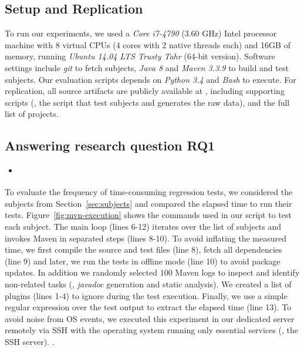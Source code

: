 \subsection{Setup and Replication}
\label{sec:setup}

To run our experiments, we used a \emph{Core i7-4790} (3.60 GHz) Intel
processor machine with 8 virtual CPUs (4 cores with 2 native threads
each) and 16GB of memory, running \emph{Ubuntu 14.04 LTS Trusty Tahr}
(64-bit version). Software settings include \emph{git} to fetch
subjects, \emph{Java 8} and \emph{Maven 3.3.9} to build and test
subjects. Our evaluation scripts depends on \emph{Python 3.4} and
\emph{Bash} to execute.  For replication, all source artifacts are
publicly available at , including supporting
scripts (\eg, the script that test subjects and generates the raw
data), and the full list of projects. 

\subsection{Answering research question RQ1}
\label{sec:rqA}

\begin{itemize}
    \item \emph{\RQA}
\end{itemize}

To evaluate the frequency of time-consuming regression tests, we
considered the \numSubjs{} subjects from Section~\ref{sec:subjects} and
compared the elapsed time to run their tests.
Figure~\ref{fig:mvn-execution} shows the commands used in our script
to test each subject. The main loop (lines 6-12) iterates over the
list of subjects and invokes Maven in separated steps (lines 8-10). To
avoid inflating the measured time, we first compile the source and
test files (line 8), fetch all dependencies (line 9) and later, we run
the tests in offline mode (line 10) to avoid package updates. In
addition we randomly selected 100 Maven logs to inspect and identify
non-related tasks (\eg, \emph{javadoc} generation and static
analysis). We created a list of plugins (lines 1-4) to ignore
during the test execution.  Finally, we use a simple regular
expression over the test output to extract the elapsed time (line 13).
To avoid noise from OS events, we executed this experiment in our
dedicated server remotely via SSH with the operating system running
only essential services (\eg, the SSH server). .

